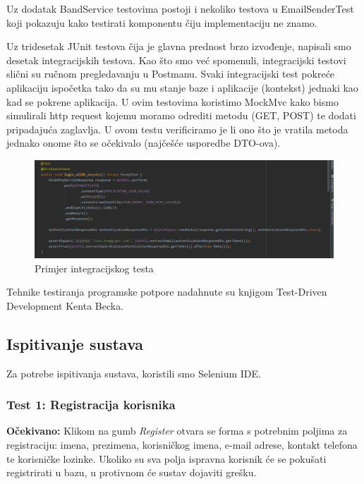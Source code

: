 			Uz dodatak BandService testovima postoji i nekoliko testova u EmailSenderTest koji pokazuju kako testirati komponentu čiju implementaciju ne znamo.
			
			
			Uz tridesetak JUnit testova čija je glavna prednost brzo izvođenje, napisali smo desetak integracijskih testova. Kao što smo već spomenuli, integracijski testovi slični su ručnom pregledavanju u Postmanu. Svaki integracijski test pokreće aplikaciju ispočetka tako da su mu stanje baze i aplikacije (kontekst) jednaki kao kad se pokrene aplikacija. U ovim testovima koristimo MockMvc kako bismo simulirali http request kojemu moramo odrediti metodu (GET, POST) te dodati pripadajuća zaglavlja. U ovom testu verificiramo je li ono što je vratila metoda jednako onome što se očekivalo (najčešće usporedbe DTO-ova).
			
			\begin{figure}[H]
				\begin{center}
					\includegraphics[width=17cm]{slike/integracijski_test.PNG}
				\end{center}
				\caption{Primjer integracijskog testa}
				\label{fig:inttest}
			\end{figure}
			
			Tehnike testiranja programske potpore nadahnute su knjigom Test-Driven Development Kenta Becka.
			
			
			
			\subsection{Ispitivanje sustava}
			
			 
		 	Za potrebe ispitivanja sustava, koristili smo Selenium IDE.
		 	
		 	\subsubsection{Test 1: Registracija korisnika}
		 		
		 		\textbf{Očekivano:} Klikom na gumb \textit{Register} otvara se forma s potrebnim poljima za registraciju: imena, prezimena, korisničkog imena, e-mail adrese, kontakt telefona te korisničke lozinke. Ukoliko su sva polja ispravna korisnik će se pokušati registrirati u bazu, u protivnom će sustav dojaviti grešku.
		 		
